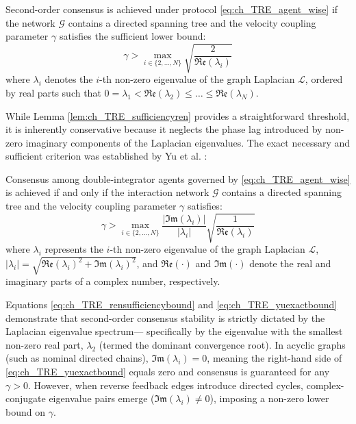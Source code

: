\begin{lemma}\label{lem:ch_TRE_sufficiencyren}
Second-order consensus is achieved under protocol \eqref{eq:ch_TRE_agent_wise} if the network $\mathcal{G}$ contains a directed spanning tree and the velocity coupling parameter $\gamma$ satisfies the sufficient lower bound:
\begin{equation} \label{eq:ch_TRE_rensufficiencybound}
	\gamma > \max_{i \in \{2, \dots, N\}} \sqrt{\frac{2}{\mathfrak{Re}(\lambda_i)}}	
\end{equation}
where $\lambda_i$ denotes the $i$-th non-zero eigenvalue of the graph Laplacian $\mathcal{L}$, ordered by real parts such that $0 = \lambda_1 < \mathfrak{Re}(\lambda_2) \le \dots \le \mathfrak{Re}(\lambda_N)$.
\end{lemma}
While Lemma \ref{lem:ch_TRE_sufficiencyren} provides a straightforward threshold, it is inherently conservative because it neglects the phase lag introduced by non-zero imaginary components of the Laplacian eigenvalues. The exact necessary and sufficient criterion was established by Yu et al. \cite{yu2010some}:
\begin{lemma}\label{lem:ch_TRE_necsuf_yu}
Consensus among double-integrator agents governed by \eqref{eq:ch_TRE_agent_wise} is achieved if and only if the interaction network $\mathcal{G}$ contains a directed spanning tree and the velocity coupling parameter $\gamma$ satisfies:
\begin{equation}\label{eq:ch_TRE_yuexactbound}
	\gamma > \max_{i \in \{2, \dots, N\}} \frac{|\mathfrak{Im}(\lambda_i)|}{|\lambda_i|} \sqrt{\frac{1}{\mathfrak{Re}(\lambda_i)}}	
\end{equation}
where $\lambda_i$ represents the $i$-th non-zero eigenvalue of the graph Laplacian $\mathcal{L}$, $|\lambda_i| = \sqrt{\mathfrak{Re}(\lambda_i)^2 + \mathfrak{Im}(\lambda_i)^2}$, and $\mathfrak{Re}(\cdot)$ and $\mathfrak{Im}(\cdot)$ denote the real and imaginary parts of a complex number, respectively.
\end{lemma}
Equations \eqref{eq:ch_TRE_rensufficiencybound} and \eqref{eq:ch_TRE_yuexactbound} demonstrate that second-order consensus stability is strictly dictated by the Laplacian eigenvalue spectrum— specifically by the eigenvalue with the smallest non-zero real part, $\lambda_2$ (termed the dominant convergence root). In acyclic graphs (such as nominal directed chains), $\mathfrak{Im}(\lambda_i) = 0$, meaning the right-hand side of \eqref{eq:ch_TRE_yuexactbound} equals zero and consensus is guaranteed for any $\gamma > 0$. However, when reverse feedback edges introduce directed cycles, complex-conjugate eigenvalue pairs emerge ($\mathfrak{Im}(\lambda_i) \neq 0$), imposing a non-zero lower bound on $\gamma$. 

